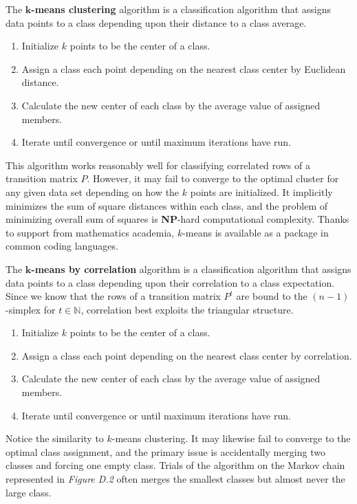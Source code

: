 \documentclass[10pt, a5paper, twoside, openright]{memoir}
\begin{document}
The \textbf{$\boldsymbol{k}$-means clustering} algorithm is a classification algorithm that assigns data points to a class depending upon their distance to a class average.
\begin{enumerate}
\item Initialize $k$ points to be the center of a class.
\item Assign a class each point depending on the nearest class center by Euclidean distance.
\item Calculate the new center of each class by the average value of assigned members.
\item Iterate until convergence or until maximum iterations have run.
\end{enumerate}
This algorithm works reasonably well for classifying correlated rows of a transition matrix $P$. However, it may fail to converge to the optimal cluster for any given data set depending on how the $k$ points are initialized. It implicitly minimizes the sum of square distances within each class, and the problem of minimizing overall sum of squares is \textbf{NP}-hard computational complexity. Thanks to support from mathematics academia, $k$-means is available as a package in common coding languages.

The \textbf{$\boldsymbol{k}$-means by correlation} algorithm is a classification algorithm that assigns data points to a class depending upon their correlation to a class expectation. Since we know that the rows of a transition matrix $P^t$ are bound to the $(n-1)$-simplex for $t \in \mathbb N$, correlation best exploits the triangular structure.
\begin{enumerate}
\item Initialize $k$ points to be the center of a class.
\item Assign a class each point depending on the nearest class center by correlation.
\item Calculate the new center of each class by the average value of assigned members.
\item Iterate until convergence or until maximum iterations have run.
\end{enumerate}
Notice the similarity to $k$-means clustering. It may likewise fail to converge to the optimal class assignment, and the primary issue is accidentally merging two classes and forcing one empty class. Trials of the algorithm on the Markov chain represented in \textit{Figure D.2} often merges the smallest classes but almost never the large class.
\end{document}
